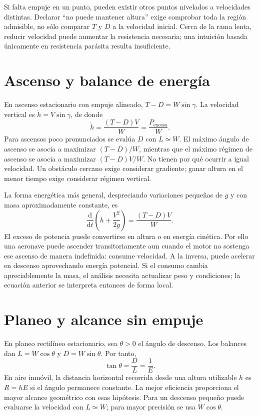 Si falta empuje en un punto, pueden existir otros puntos nivelados a velocidades distintas. Declarar ``no puede mantener altura'' exige comprobar toda la región admisible, no sólo comparar $T$ y $D$ a la velocidad inicial. Cerca de la rama lenta, reducir velocidad puede aumentar la resistencia necesaria; una intuición basada únicamente en resistencia parásita resulta insuficiente.

\section{Ascenso y balance de energía}
En ascenso estacionario con empuje alineado, $T-D=W\sin\gamma$. La velocidad vertical es $\dot h=V\sin\gamma$, de donde
\begin{equation}\label{eq:11-climb}
\dot h=\frac{(T-D)V}{W}=\frac{P_{\mathrm{exceso}}}{W}.
\end{equation}
Para ascensos poco pronunciados se evalúa $D$ con $L\simeq W$. El máximo ángulo de ascenso se asocia a maximizar $(T-D)/W$, mientras que el máximo régimen de ascenso se asocia a maximizar $(T-D)V/W$. No tienen por qué ocurrir a igual velocidad. Un obstáculo cercano exige considerar gradiente; ganar altura en el menor tiempo exige considerar régimen vertical.

La forma energética más general, despreciando variaciones pequeñas de $g$ y con masa aproximadamente constante, es
\begin{equation}
\frac{\mathrm d}{\mathrm dt}\left(h+\frac{V^2}{2g}\right)
=\frac{(T-D)V}{W}.
\end{equation}
El exceso de potencia puede convertirse en altura o en energía cinética. Por ello una aeronave puede ascender transitoriamente aun cuando el motor no sostenga ese ascenso de manera indefinida: consume velocidad. A la inversa, puede acelerar en descenso aprovechando energía potencial. Si el consumo cambia apreciablemente la masa, el análisis necesita actualizar peso y condiciones; la ecuación anterior se interpreta entonces de forma local.

\section{Planeo y alcance sin empuje}
En planeo rectilíneo estacionario, sea $\theta>0$ el ángulo de descenso. Los balances dan $L=W\cos\theta$ y $D=W\sin\theta$. Por tanto,
\begin{equation}
\tan\theta=\frac DL=\frac1E.
\end{equation}
En aire inmóvil, la distancia horizontal recorrida desde una altura utilizable $h$ es $R=hE$ si el ángulo permanece constante. La mejor eficiencia proporciona el mayor alcance geométrico con esas hipótesis. Para un descenso pequeño puede evaluarse la velocidad con $L\simeq W$; para mayor precisión se usa $W\cos\theta$.

